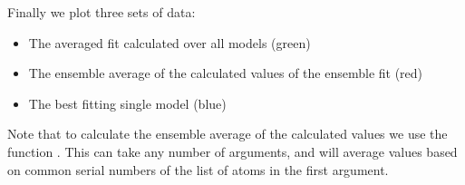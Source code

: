 \documentclass[a4paper,10pt,english,openany,oneside]{sphinxmanual}
\begin{document}
%
\begin{sphinxVerbatim}[commandchars=\\\{\}]
  
   
      \PYG{p}{[}\PYG{p}{[}\PYG{p}{]}\PYG{p}{]}
    \PYG{p}{[}\PYG{p}{]} \PYG{p}{[}\PYG{p}{]}  \PYG{p}{[}\PYG{p}{]} \PYG{p}{[}\PYG{p}{]}  
    \PYG{p}{[}\PYG{p}{]} \PYG{p}{[}\PYG{p}{]}  \PYG{p}{[}\PYG{p}{]} \PYG{p}{[}\PYG{p}{]}
      
    \PYG{p}{[}\PYG{p}{]}    
\end{sphinxVerbatim}

Finally we plot three sets of data:
\begin{itemize}
\item {} 
The averaged fit calculated over all models (green)

\item {} 
The ensemble average of the calculated values of the ensemble fit (red)

\item {} 
The best fitting single model (blue)

\end{itemize}

Note that to calculate the ensemble average of the calculated values we use the function {\hyperref[\detokenize{reference/generated/paramagpy.fit.ensemble_average:paramagpy.fit.ensemble_average}]{}}. This can take any number of arguments, and will average values based on common serial numbers of the list of atoms in the first argument.
\end{document}
